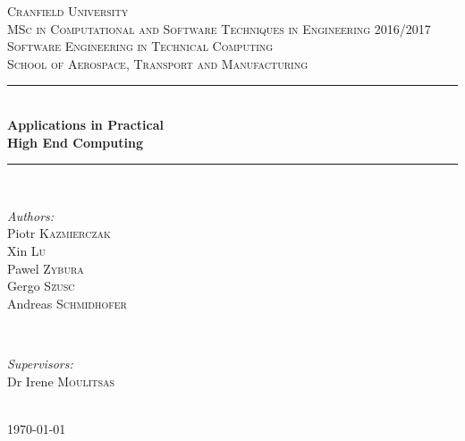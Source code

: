 \documentclass[a4paper, 11pt, article]{report}
\begin{document}
   
    \begin{titlepage}
        \newcommand{\HRule}{\rule{\linewidth}{0.5mm}}
       
        \center
        \textsc{\LARGE Cranfield University}\\[1.5cm]
        \textsc{\Large MSc in Computational and Software Techniques in Engineering 2016/2017}\\[0.5cm]
        \textsc{\large Software Engineering in Technical Computing}\\[0.5cm]
        \textsc{\large School of Aerospace, Transport and Manufacturing}\\[0.5cm]
       
        \HRule \\[0.4cm]
        {\huge \bfseries Applications in Practical  \\[0.5cm]
       High End Computing}\\[0.4cm]
        \HRule \\[1.5cm]
       
        \begin{minipage}{0.4\textwidth}
            \begin{flushleft} \large
                \emph{Authors:}\\
                Piotr \textsc{Kazmierczak} \\
                 Xin \textsc{Lu} \\
                  Pawel \textsc{Zybura} \\ 
                   Gergo \textsc{Szusc} \\
                    Andreas \textsc{Schmidhofer} \\
            \end{flushleft}
        \end{minipage}
        ~
        \begin{minipage}{0.4\textwidth}
            \begin{flushright} \large
                \emph{Supervisors:}
                \\ Dr  Irene \textsc{Moulitsas}
              
            \end{flushright}
        \end{minipage}\\[1cm]
       
        
       
        \vfill
        {\large \today}
        \clearpage
    \end{titlepage}
 
\end{document}
